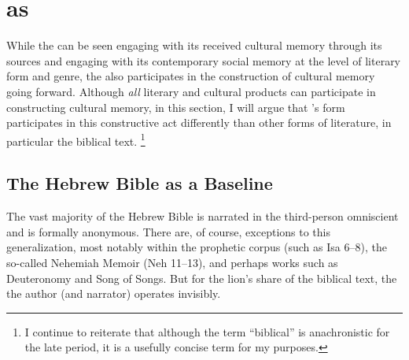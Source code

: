 
\section{\ga as \psa}

While the \ga can be seen engaging with its received cultural memory through its sources and engaging with its contemporary social memory at the level of literary form and genre, the \ga also participates in the construction of cultural memory going forward. Although \emph{all} literary and cultural products can participate in constructing cultural memory, in this section, I will argue that \ga's \psgraphic form participates in this constructive act differently than other forms of literature, in particular the biblical text.%
\footnote{I continue to reiterate that although the term ``biblical'' is anachronistic for the late \secondtemple period, it is a usefully concise term for my purposes.}

\subsection{The Hebrew Bible as a Baseline}

The vast majority of the Hebrew Bible is narrated in the third-person omniscient and is formally anonymous. There are, of course, exceptions to this generalization, most notably within the prophetic corpus (such as Isa 6--8), the so-called Nehemiah Memoir (Neh 11--13), and perhaps works such as Deuteronomy and Song of Songs. But for the lion's share of the biblical text, the the author (and narrator) operates invisibly.

